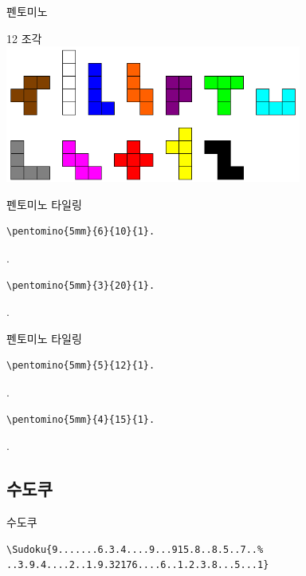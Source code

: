 \documentclass[xcolor=svgnames]{beamer}
\begin{document}
%
\begin{frame}{펜토미노}
  \begin{center}
  {\Large 12 조각} \\
  \includegraphics[height=4.5cm]{imgs/pentominoes.png}
  \end{center}
\end{frame}

%
\begin{frame}[fragile]{펜토미노 타일링}
\begin{verbatim}
\pentomino{5mm}{6}{10}{1}.
\end{verbatim}
\vspace{-5mm}
.
\vspace{-5mm}
\begin{verbatim}
\pentomino{5mm}{3}{20}{1}.
\end{verbatim}
\vspace{-5mm}
.
\end{frame}

%
\begin{frame}[fragile]{펜토미노 타일링}
\begin{verbatim}
\pentomino{5mm}{5}{12}{1}.
\end{verbatim}
\vspace{-5mm}
.
\vspace{-5mm}
\begin{verbatim}
\pentomino{5mm}{4}{15}{1}.
\end{verbatim}
\vspace{-5mm}
.
\end{frame}


\subsection{수도쿠}

%
\begin{frame}[fragile]{수도쿠}
\begin{verbatim}
\Sudoku{9.......6.3.4....9...915.8..8.5..7..%
..3.9.4....2..1.9.32176....6..1.2.3.8...5...1}
\end{verbatim}  
\begin{center}
\end{center}
\end{frame}
\end{document}

